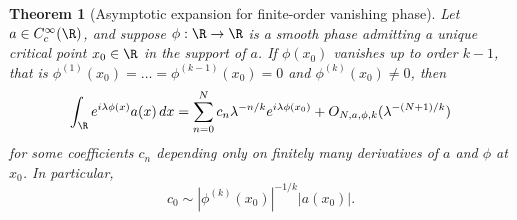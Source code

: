 \documentclass[reqno]{amsart}
\newtheorem{theorem}{Theorem}
\theoremstyle{definition}
\theoremstyle{remark}
\begin{document}
\begin{theorem}[Asymptotic expansion for finite-order vanishing phase]
	Let $a \in C^\infty_c (\R)$, and suppose $\phi : \R \to \R$ is a smooth phase admitting a unique critical point $x_0 \in \R$ in the support of $a$. If $\phi(x_0)$ vanishes up to order $k - 1$, that is $\phi^{(1)} (x_0) = \dots = \phi^{(k - 1)} (x_0) = 0$ and $\phi^{(k)} (x_0) \neq 0$, then 
		\[ \int_{\R} e^{i \lambda \phi(x)} a(x) \, dx = \sum_{n = 0}^N c_n \lambda^{-n/k} e^{i \lambda \phi(x_0)} + O_{N, a, \phi ,k} (\lambda^{-(N + 1)/k}) \]
	for some coefficients $c_n$ depending only on finitely many derivatives of $a$ and $\phi$ at $x_0$. In particular, 
		\[ c_0 \sim |\phi^{(k)} (x_0)|^{-1/k} |a(x_0)| . \]	
\end{theorem}
\end{document}
